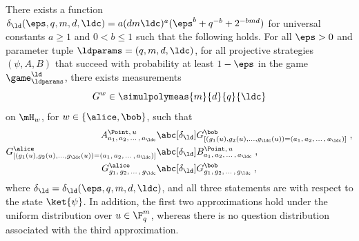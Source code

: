 \begin{theorem}
  \label{lem:ld-soundness}
  There exists a function $\delta_{\ld}(\eps, q, m, d, \ldc) = a (dm \ldc)^a (\eps^b + q^{-b} + 2^{-bmd})$ for universal constants $a\geq 1$ and $0<b\leq 1$ 
such that the following
  holds.
  For all $\eps > 0$ and parameter tuple $\ldparams = (q, m, d, \ldc)$, for all
  projective strategies $(\psi,A,B)$ that succeed with probability at least
  $1-\eps$ in the game $\game^\ld_\ldparams$, there exists measurements
  \[G^w \in \simulpolymeas{m}{d}{q}{\ldc}\] on $\mH_w$, for
  $w\in\{\alice,\bob\}$, such that
  \begin{equation*}
    \begin{split}
      A^{\Point,\, u}_{a_1,\, a_2,\, \ldots\,,\, a_\ldc}
      & \abc[\delta_{\ld}]
      G^\bob_{[(g_1(u),g_2(u),\ldots,g_\ldc(u)) = (a_1,\, a_2,\, \ldots \,,\, a_\ldc)]}\;,\\
      G^\alice_{[(g_1(u),g_2(u),\ldots,g_\ldc(u)) = (a_1,\, a_2,\, \ldots \,,\, a_\ldc)]}
      & \abc[\delta_{\ld}]
			 B^{\Point,\, u}_{a_1,\, a_2,\, \ldots\,,\, a_\ldc}\;,\\
      G^\alice_{g_1,\, g_2,\, \ldots \,,\, g_\ldc}
      & \abc[\delta_{\ld}]
      G^\bob_{g_1,\, g_2,\, \ldots \,,\, g_\ldc}\;,
    \end{split}
  \end{equation*}
  where $\delta_{\ld} = \delta_{\ld}(\eps, q, m, d, \ldc)$, 
  and all three statements are with respect to the state $\ket{\psi}$.
In addition, the first two approximations hold under the uniform distribution over $u\in \F_q^m$,
	whereas there is no question distribution associated with the third approximation.
\end{theorem}

